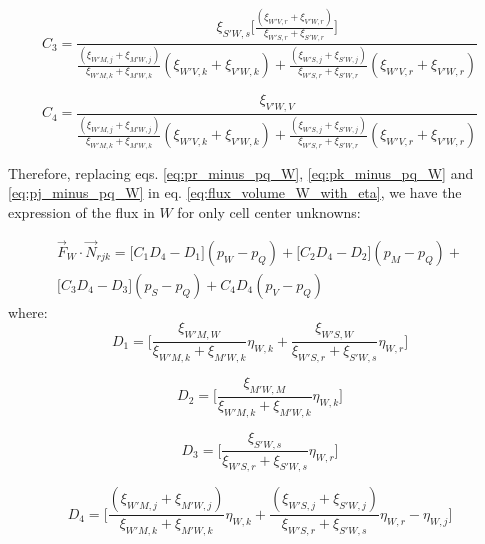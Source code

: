 \documentclass{article}
\begin{document}
\begin{displaymath}
C_{3} =  \frac{\xi_{S'W,s}\Bigg[\frac{(\xi_{W'V,r}+\xi_{V'W,r})}{\xi_{W'S,r}+\xi_{S'W,r}}\Bigg]}{\frac{(\xi_{W'M,j}+\xi_{M'W,j})}{\xi_{W'M,k}+\xi_{M'W,k}}(\xi_{W'V,k}+\xi_{V'W,k})+\frac{(\xi_{W'S,j}+\xi_{S'W,j})}{\xi_{W'S,r}+\xi_{S'W,r}}(\xi_{W'V,r}+\xi_{V'W,r})}
\end{displaymath}

\begin{displaymath}
C_{4} =  \frac{\xi_{V'W,V}}{\frac{(\xi_{W'M,j}+\xi_{M'W,j})}{\xi_{W'M,k}+\xi_{M'W,k}}(\xi_{W'V,k}+\xi_{V'W,k})+\frac{(\xi_{W'S,j}+\xi_{S'W,j})}{\xi_{W'S,r}+\xi_{S'W,r}}(\xi_{W'V,r}+\xi_{V'W,r})}
\end{displaymath}


Therefore, replacing eqs. \ref{eq:pr_minus_pq_W}, \ref{eq:pk_minus_pq_W} and \ref{eq:pj_minus_pq_W} in eq. \ref{eq:flux_volume_W_with_eta}, we have the expression of the flux in $ W $ for only cell center unknowns:

\begin{equation} \label{eq:flux_W_coefficients}
\begin{split}
\vec{F}_{W} \cdot \vec{N}_{rjk} = \Bigg[C_{1}D_{4}-D_{1}\Bigg](p_{W}-p_{Q})+ \Bigg[C_{2}D_{4}-D_{2}\Bigg](p_{M} - p_{Q})+\\
\Bigg[C_{3}D_{4}-D_{3}\Bigg](p_{S} - p_{Q})+C_{4}D_{4}(p_{V} - p_{Q})
\end{split}
\end{equation}
where:
\begin{displaymath}
D_{1} = \Bigg[\frac{\xi_{W'M,W}}{\xi_{W'M,k}+\xi_{M'W,k}}\eta_{W,k} + \frac{\xi_{W'S,W}}{\xi_{W'S,r}+\xi_{S'W,s}}\eta_{W,r}\Bigg]
\end{displaymath}

\begin{displaymath}
D_{2} = \Bigg[\frac{\xi_{M'W,M}}{\xi_{W'M,k}+\xi_{M'W,k}}\eta_{W,k}\Bigg]
\end{displaymath}

\begin{displaymath}
D_{3} = \Bigg[\frac{\xi_{S'W,s}}{\xi_{W'S,r}+\xi_{S'W,s}}\eta_{W,r}\Bigg]
\end{displaymath}

\begin{displaymath}
D_{4} = \Bigg[\frac{(\xi_{W'M,j}+\xi_{M'W,j})}{\xi_{W'M,k}+\xi_{M'W,k}}\eta_{W,k}+\frac{(\xi_{W'S,j}+\xi_{S'W,j})}{\xi_{W'S,r}+\xi_{S'W,s}}\eta_{W,r}- \eta_{W,j}\Bigg]
\end{displaymath}
\end{document}
